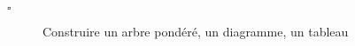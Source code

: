 \begin{titre}[Probabilités]

\end{titre}


\begin{CpsCol}
\begin{description}
\item[$\square$] Construire un arbre pondéré, un diagramme, un tableau
\end{description}
\end{CpsCol}




